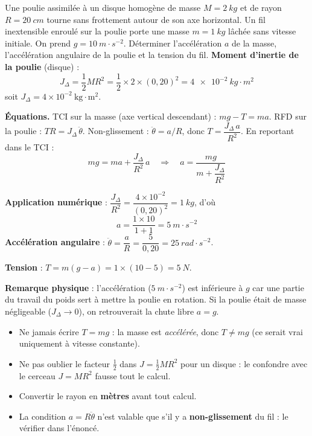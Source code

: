 \documentclass[11pt]{article}
\begin{document}
\begin{exoresolu}
Une poulie assimilée à un disque homogène de masse $M = \SI{2}{kg}$ et de rayon $R = \SI{20}{cm}$ tourne sans frottement autour de son axe horizontal. Un fil inextensible enroulé sur la poulie porte une masse $m = \SI{1}{kg}$ lâchée sans vitesse initiale. On prend $g = \SI{10}{m\cdot s^{-2}}$. Déterminer l'accélération $a$ de la masse, l'accélération angulaire de la poulie et la tension du fil.
\tcblower
\textbf{Moment d'inertie de la poulie} (disque) :
\[ J_\Delta = \frac{1}{2} M R^2 = \frac{1}{2} \times 2 \times (0,20)^2 = \SI{4e-2}{kg\cdot m^2} \]
soit $J_\Delta = 4\times 10^{-2}\ \mathrm{kg\cdot m^2}$.

\textbf{Équations.} TCI sur la masse (axe vertical descendant) : $m g - T = m a$. RFD sur la poulie : $T R = J_\Delta\,\ddot{\theta}$. Non-glissement : $\ddot{\theta} = a/R$, donc $T = \dfrac{J_\Delta\, a}{R^2}$. En reportant dans le TCI :
\[ m g = m a + \frac{J_\Delta}{R^2}\, a \quad\Longrightarrow\quad a = \frac{m g}{m + \dfrac{J_\Delta}{R^2}} \]

\textbf{Application numérique} : $\dfrac{J_\Delta}{R^2} = \dfrac{4\times 10^{-2}}{(0,20)^2} = \SI{1}{kg}$, d'où
\[ a = \frac{1 \times 10}{1 + 1} = \SI{5}{m\cdot s^{-2}} \]
\textbf{Accélération angulaire} : $\ddot{\theta} = \dfrac{a}{R} = \dfrac{5}{0,20} = \SI{25}{rad\cdot s^{-2}}$.

\textbf{Tension} : $T = m(g - a) = 1\times(10-5) = \SI{5}{N}$.

\textbf{Remarque physique} : l'accélération ($\SI{5}{m\cdot s^{-2}}$) est inférieure à $g$ car une partie du travail du poids sert à mettre la poulie en rotation. Si la poulie était de masse négligeable ($J_\Delta \to 0$), on retrouverait la chute libre $a = g$.
\end{exoresolu}

\begin{attention}
\begin{itemize}
\item Ne jamais écrire $T = m g$ : la masse est \emph{accélérée}, donc $T \neq mg$ (ce serait vrai uniquement à vitesse constante).
\item Ne pas oublier le facteur $\tfrac{1}{2}$ dans $J = \tfrac{1}{2}MR^2$ pour un disque : le confondre avec le cerceau $J = MR^2$ fausse tout le calcul.
\item Convertir le rayon en \textbf{mètres} avant tout calcul.
\item La condition $a = R\ddot{\theta}$ n'est valable que s'il y a \textbf{non-glissement} du fil : le vérifier dans l'énoncé.
\end{itemize}
\end{attention}
\end{document}

